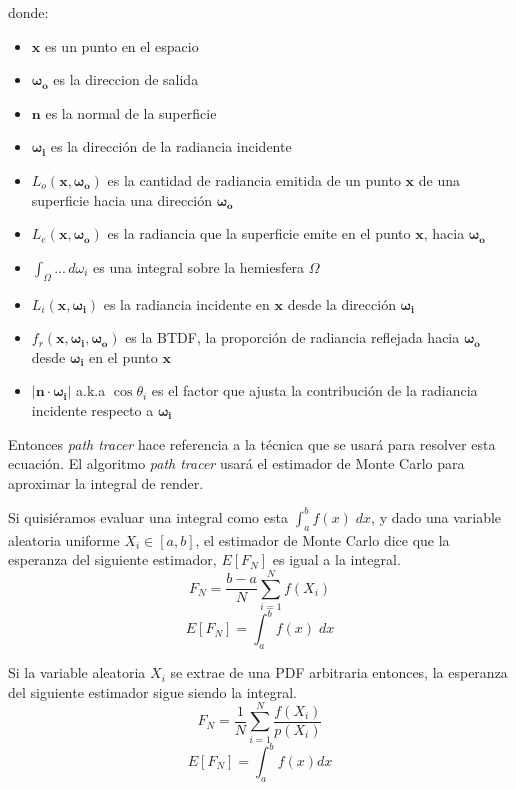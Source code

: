 \documentclass{article}
\begin{document}
donde:
\begin{itemize}
  \item \(\mathbf{x}\) es un punto en el espacio
  \item \(\mathbf{\omega_{o}}\) es la direccion de salida
  \item \(\mathbf{n}\) es la normal de la superficie
  \item \(\mathbf{\omega_{i}}\) es la dirección de la radiancia incidente
  \item \(L_o(\mathbf{x}, \mathbf{\omega_{o}})\) es la cantidad de radiancia
        emitida de un punto \(\mathbf{x}\) de una superficie hacia una dirección
        \(\mathbf{\omega_{o}}\)
  \item \(L_e(\mathbf{x}, \mathbf{\omega_{o}})\) es la radiancia que la
        superficie emite en el punto \(\mathbf{x}\), hacia
        \(\mathbf{\omega_{o}}\)
  \item \(\int_{\Omega} ... \, d\omega_{i}\) es una integral sobre la hemiesfera
        \(\Omega\)
  \item \(L_i(\mathbf{x}, \mathbf{\omega_{i}}) \) es la radiancia incidente en
        \(\mathbf{x}\) desde la dirección \(\mathbf{\omega_{i}}\)
  \item \(f_r(\mathbf{x}, \mathbf{\omega_{i}}, \mathbf{\omega_{o}}) \) es la
        BTDF, la proporción de radiancia reflejada hacia \(\mathbf{\omega_{o}}\)
        desde \(\mathbf{\omega_{i}}\) en el punto \(\mathbf{x}\)
  \item \(|\mathbf{n} \cdot \mathbf{\omega_{i}}|\) a.k.a \(\cos\theta_{i}\) es
        el factor que ajusta la contribución de la radiancia incidente respecto
        a \(\mathbf{\omega_{i}}\)
\end{itemize}

Entonces \textit{path tracer} hace referencia a la técnica que se usará para
resolver esta ecuación. El algoritmo \textit{path tracer} usará el estimador de
Monte Carlo para aproximar la integral de render.

Si quisiéramos evaluar una integral como esta \(\int^{b}_{a} f(x) \; dx\), y
dado una variable aleatoria uniforme \(X_{i} \in [a, b]\), el estimador de Monte
Carlo dice que la esperanza del siguiente estimador, \(E[F_{N}]\) es igual a la
integral.
\[F_{N}=\frac{b-a}{N} \sum_{i=1}^{N} f(X_{i}) \]
\[E[F_{N}]= \int^{b}_{a} f(x) \; dx\]

Si la variable aleatoria \(X_{i}\) se extrae de una PDF arbitraria entonces, la
esperanza del siguiente estimador sigue siendo la integral.
\begin{equation}
  F_{N}=\frac{1}{N} \sum_{i=1}^{N} \frac{f(X_{i})}{p(X_{i})}
\end{equation}
\begin{equation}
  E[F_{N}]= \int^{b}_{a} f(x) dx
\end{equation}
\end{document}
